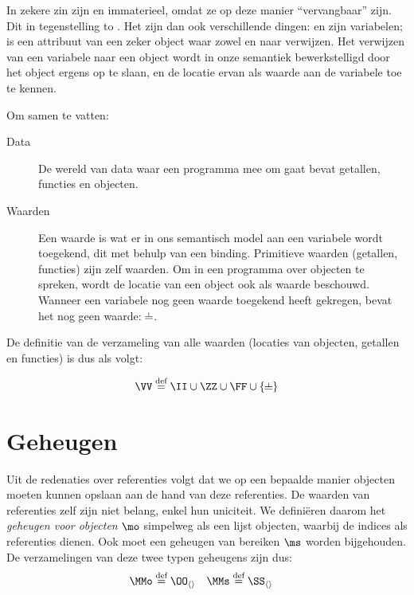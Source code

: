\begin{NoBreak}
  \codeFragmentCaption
\end{NoBreak}

In zekere zin zijn  en  immaterieel, omdat ze op deze manier “vervangbaar” zijn. Dit in tegenstelling to . Het zijn dan ook verschillende dingen:  en  zijn variabelen;  is een attribuut van een zeker object waar zowel  en  naar verwijzen.
Het verwijzen van een variabele naar een object wordt in onze semantiek bewerkstelligd door het object ergens op te slaan, en de locatie ervan als waarde aan de variabele toe te kennen.

Om samen te vatten:
\begin{description}
  \item[Data] De wereld van data waar een programma mee om gaat bevat getallen, functies en objecten.
  \item[Waarden] Een waarde is wat er in ons semantisch model aan een variabele wordt toegekend, dit met behulp van een binding. Primitieve waarden (getallen, functies) zijn zelf waarden. Om in een programma over objecten te spreken, wordt de locatie van een object ook als waarde beschouwd. Wanneer een variabele nog geen waarde toegekend heeft gekregen, bevat het nog geen waarde: $\nil$.
\end{description}

De definitie van de verzameling van alle waarden (locaties van objecten, getallen en functies) is dus als volgt:

\begin{equation*}
  \VV \DEF \II \cup \ZZ \cup \FF \cup \{\nil\}%
\end{equation*}

\section{Geheugen}
\label{sec:locaties}

Uit de redenaties over referenties volgt dat we op een bepaalde manier objecten moeten kunnen opslaan aan de hand van deze referenties. De waarden van referenties zelf zijn niet belang, enkel hun uniciteit. We definiëren daarom het \emph{geheugen voor objecten} $\mo$ simpelweg als een lijst objecten, waarbij de indices als referenties dienen. Ook moet een geheugen van bereiken $\ms$ worden bijgehouden. De verzamelingen van deze twee typen geheugens zijn dus:
%
\begin{align*}
  \MMo &\DEF \OO_{\langle\rangle} &
  \MMs &\DEF \SS_{\langle\rangle}
\end{align*}

